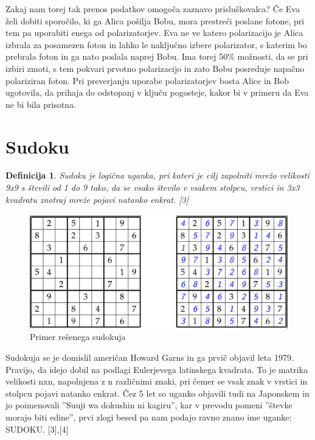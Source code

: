 \documentclass[A4paper, 11pt]{article}
\newtheorem{definicija}{Definicija}
\begin{document}
Zakaj nam torej tak prenos podatkov omogoča zaznavo prisluškovalca?
Če Eva želi dobiti sporočilo, ki ga Alica pošilja Bobu, mora prestreči poslane fotone, pri tem pa uporabiti enega od polarizatorjev. Eva ne ve katero polarizacijo je Alica izbrala za posamezen foton in lahko le naključno izbere polarizator, s katerim bo prebrala foton in ga nato poslala naprej Bobu. Ima torej 50\% možnosti, da se pri izbiri zmoti, s tem pokvari prvotno polarizacijo in zato Bobu posreduje napačno polariziran foton. Pri preverjanju uporabe polarizatorjev bosta Alice in Bob ugotovila, da prihaja do odstopanj v ključu pogosteje, kakor bi v primeru da Eva ne bi bila prisotna.



\section{Sudoku}

\begin{definicija}
Sudoku je logična uganka, pri kateri je cilj zapolniti mrežo velikosti 9x9 s števili od 1 do 9 tako, da se vsako število v vsakem stolpcu, vrstici in 3x3 kvadratu znotraj mreže pojavi natanko enkrat. [3]
\end{definicija}

\begin{figure}[h]
\centering
\caption{Primer rešenega sudokuja}
\includegraphics[scale=0.4]{sudoku_resen}
\end{figure}

Sudokuja se je domislil američan Howard Garns in ga prvič objavil leta 1979. Pravijo, da idejo dobil na podlagi Eulerjevega latinskega kvadrata. To je matrika velikosti nxn, napolnjena z n različnimi znaki, pri čemer se vsak znak v vrstici in stolpcu pojavi natanko enkrat. Čez 5 let so uganko objavili tudi na Japonskem in jo poimenovali ''Suuji wa dokushin ni kagiru'', kar v prevodu pomeni ''števke morajo biti edine'', prvi zlogi besed pa nam podajo ravno znano ime uganke: SUDOKU. [3],[4]
\end{document}
